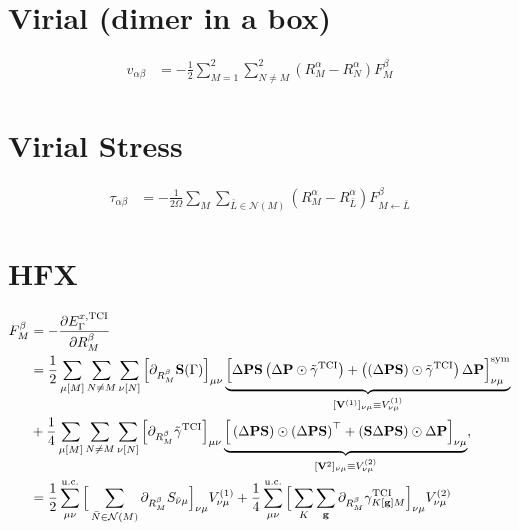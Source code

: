 \documentclass[11pt,a4paper]{article}
\begin{document}
\section*{Virial (dimer in a box)}
\begin{align}
v_{\alpha\beta} &= -\frac{1}{2} \sum_{M=1}^2 \sum_{N\neq M}^2 (R_M^\alpha - R_{N}^\alpha) F_{M}^\beta
\end{align}

\section*{Virial Stress}
\begin{align}
\tau_{\alpha\beta} &= -\frac{1}{2\Omega} \sum_{M} \sum_{\bar{L}\in\mathcal{N}(M)} (R_M^\alpha - R_{\bar{L}}^\alpha) F_{M\leftarrow \bar{L}}^\beta
\end{align}

\section*{HFX}
\begin{align}
F^\beta_M &= -\frac{\partial E^{x,\mathrm{TCI}}_\Gamma}{\partial R^\beta_M}
\\
&= \frac{1}{2} \sum_{\mu[M]} \sum_{N \neq M} \sum_{\nu[N]} \Big[ \partial_{R^\beta_M} \mathbf{S}(\Gamma) \Big]_{\mu\nu} \underbrace{ \Big[ \Delta \mathbf{P} \mathbf{S} \left( \Delta \mathbf{P} \odot \tilde{\gamma}^\mathrm{TCI} \right) + \left( \left( \Delta \mathbf{P} \mathbf{S} \right) \odot \tilde{\gamma}^\mathrm{TCI} \right) \Delta\mathbf{P} \Big]^\text{sym}_{\nu\mu}}_{[\mathbf{V}^{(1)}]_{\nu\mu} \equiv V^{(1)}_{\nu\mu}} \notag
\\
&+ \frac{1}{4} \sum_{\mu[M]} \sum_{N \neq M} \sum_{\nu[N]} \Big[ \partial_{R^\beta_M} \tilde{\gamma}^\mathrm{TCI} \Big]_{\mu\nu} \underbrace{ \Big[ \left( \Delta \mathbf{P} \mathbf{S} \right) \odot \left( \Delta \mathbf{P} \mathbf{S} \right)^\top + \left( \mathbf{S} \Delta \mathbf{P} \mathbf{S} \right) \odot \Delta \mathbf{P} \Big]_{\nu\mu}}_{[\mathbf{V}^2]_{\nu\mu} \equiv V^{(2)}_{\nu\mu}},
\\
&= \frac{1}{2} \sum_{\mu\nu}^\mathrm{u.c.} \Big[ \sum_{\bar{N}\in\mathcal{N}(M)} \partial_{R^\beta_M} S_{\bar{\nu}\mu} \Big]_{\nu\mu} V^{(1)}_{\nu\mu} + \frac{1}{4} \sum_{\mu\nu}^\mathrm{u.c.} \Big[ \sum_K \sum_{\mathbf{g}} \partial_{R^\beta_M} \gamma^\mathrm{TCI}_{K[\mathbf{g}]M} \Big]_{\nu\mu} V^{(2)}_{\nu\mu}
\end{align}
\end{document}
